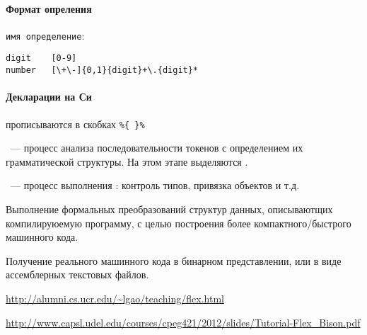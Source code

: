 \paragraph{Формат опреления} \verb|имя определение|:
\begin{verbatim}
digit    [0-9]
number   [\+\-]{0,1}{digit}+\.{digit}*
\end{verbatim}

\paragraph{Декларации на Си} прописываются в скобках \verb|%{ }%|







\begin{framed}
\ --- процесс анализа
последовательности токенов с определением их грамматической структуры. На этом
этапе выделяются .
\end{framed}


\begin{framed}
\ --- процесс выполнения
: контроль типов, привязка объектов и т.д. 
\end{framed}


Выполнение формальных преобразований структур данных, описываютщих
компилируюемую программу, с целью построения более компактного/быстрого
машинного кода.


Получение реального машинного кода в бинарном представлении, или в виде
ассемблерных текстовых файлов.

\label{lexlit}

\bigskip

\url{http://alumni.cs.ucr.edu/~lgao/teaching/flex.html}

\url{http://www.capsl.udel.edu/courses/cpeg421/2012/slides/Tutorial-Flex\_Bison.pdf}



\secup
